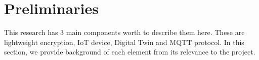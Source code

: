 

\chapter{Preliminaries} 
\label{Chapter3}


This research has 3 main components worth to describe them here. These are lightweight encryption, IoT device, Digital Twin and MQTT protocol. In this section, we provide background of each element from its relevance to the project. 






